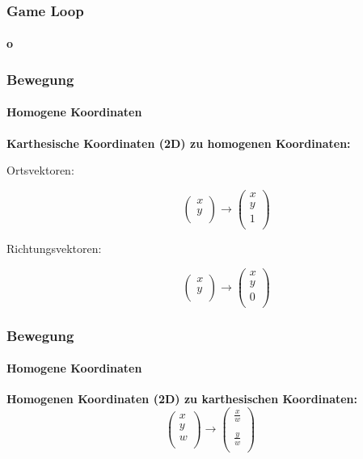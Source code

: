\documentclass[dvips,12pt,xcolor=table]{beamer}
\begin{document}
\begin{frame}
\frametitle{Game Loop}
\framesubtitle{o}
\end{frame}


\begin{frame}
\frametitle{Bewegung}
\framesubtitle{Homogene Koordinaten}
\textbf{Karthesische Koordinaten (2D) zu homogenen Koordinaten:}
\begin{description}
 \item[Ortsvektoren:]
  \begin{equation}
   \left(\begin{array}{c}
    x \\
    y \\
   \end{array}\right)
   \rightarrow
   \left(\begin{array}{c}
    x \\
    y \\
    1 \\
   \end{array}\right)
  \end{equation}

 \item[Richtungsvektoren:]
  \begin{equation}
   \left(\begin{array}{c}
    x \\
    y \\
   \end{array}\right)
   \rightarrow
   \left(\begin{array}{c}
    x \\
    y \\
    0 \\
   \end{array}\right)
  \end{equation}
\end{description}
\end{frame}

\begin{frame}
\frametitle{Bewegung}
\framesubtitle{Homogene Koordinaten}
\textbf{Homogenen Koordinaten (2D) zu karthesischen Koordinaten: \\}
\begin{equation}
 \left(\begin{array}{c}
  x \\
  y \\
  w \\
 \end{array}\right)
 \rightarrow
 \left(\begin{array}{c}
  \frac{x}{w} \\
  \\
  \frac{y}{w} \\
 \end{array}\right)
\end{equation}
\end{frame}
\end{document}
